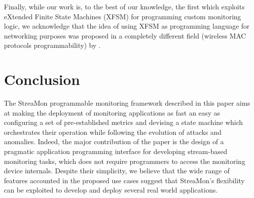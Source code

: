 \documentclass[conference,letterpaper]{sig-alternate-10pt}
\begin{document}
Finally, while our work is, to the best of our knowledge, the first which exploits eXtended Finite State Machines 
(XFSM) for programming custom monitoring logic, we acknowledge that the idea of using XFSM as programming language for networking purposes was proposed in a completely different field (wireless MAC protocols programmability) by \cite{bia12}.





\section{Conclusion}
\label{s:conclusion}
The StreaMon programmable monitoring framework described in this paper aims at making the deployment of monitoring applications as fast an easy as configuring a set of pre-established metrics and devising a state machine which orchestrates their operation while following the evolution of attacks and anomalies. Indeed, the major contribution of the paper is the design of a pragmatic application programming interface for developing stream-based monitoring tasks, which does not require programmers to access the monitoring device internals.  Despite their simplicity, we believe that the wide range of features accounted in the proposed use cases suggest that StreaMon's flexibility can be exploited to develop and deploy several real world applications. 







\footnotesize


\end{document}
